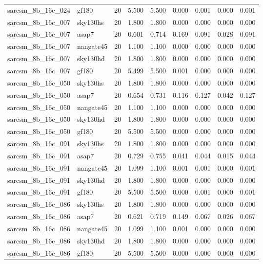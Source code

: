 \begin{tabular}{llrrrrrrr}
sarcsm\_8b\_16c\_024 & gf180 & 20 & 5.500 & 5.500 & 0.000 & 0.001 & 0.000 & 0.001 \\
sarcsm\_8b\_16c\_007 & sky130hs & 20 & 1.800 & 1.800 & 0.000 & 0.000 & 0.000 & 0.000 \\
sarcsm\_8b\_16c\_007 & asap7 & 20 & 0.601 & 0.714 & 0.169 & 0.091 & 0.028 & 0.091 \\
sarcsm\_8b\_16c\_007 & nangate45 & 20 & 1.100 & 1.100 & 0.000 & 0.000 & 0.000 & 0.000 \\
sarcsm\_8b\_16c\_007 & sky130hd & 20 & 1.800 & 1.800 & 0.000 & 0.000 & 0.000 & 0.000 \\
sarcsm\_8b\_16c\_007 & gf180 & 20 & 5.499 & 5.500 & 0.001 & 0.000 & 0.000 & 0.000 \\
sarcsm\_8b\_16c\_050 & sky130hs & 20 & 1.800 & 1.800 & 0.000 & 0.000 & 0.000 & 0.000 \\
sarcsm\_8b\_16c\_050 & asap7 & 20 & 0.654 & 0.731 & 0.116 & 0.127 & 0.042 & 0.127 \\
sarcsm\_8b\_16c\_050 & nangate45 & 20 & 1.100 & 1.100 & 0.000 & 0.000 & 0.000 & 0.000 \\
sarcsm\_8b\_16c\_050 & sky130hd & 20 & 1.800 & 1.800 & 0.000 & 0.000 & 0.000 & 0.000 \\
sarcsm\_8b\_16c\_050 & gf180 & 20 & 5.500 & 5.500 & 0.000 & 0.000 & 0.000 & 0.000 \\
sarcsm\_8b\_16c\_091 & sky130hs & 20 & 1.800 & 1.800 & 0.000 & 0.000 & 0.000 & 0.000 \\
sarcsm\_8b\_16c\_091 & asap7 & 20 & 0.729 & 0.755 & 0.041 & 0.044 & 0.015 & 0.044 \\
sarcsm\_8b\_16c\_091 & nangate45 & 20 & 1.099 & 1.100 & 0.001 & 0.001 & 0.000 & 0.001 \\
sarcsm\_8b\_16c\_091 & sky130hd & 20 & 1.800 & 1.800 & 0.000 & 0.000 & 0.000 & 0.000 \\
sarcsm\_8b\_16c\_091 & gf180 & 20 & 5.500 & 5.500 & 0.000 & 0.001 & 0.000 & 0.001 \\
sarcsm\_8b\_16c\_086 & sky130hs & 20 & 1.800 & 1.800 & 0.000 & 0.000 & 0.000 & 0.000 \\
sarcsm\_8b\_16c\_086 & asap7 & 20 & 0.621 & 0.719 & 0.149 & 0.067 & 0.026 & 0.067 \\
sarcsm\_8b\_16c\_086 & nangate45 & 20 & 1.099 & 1.100 & 0.001 & 0.000 & 0.000 & 0.000 \\
sarcsm\_8b\_16c\_086 & sky130hd & 20 & 1.800 & 1.800 & 0.000 & 0.000 & 0.000 & 0.000 \\
sarcsm\_8b\_16c\_086 & gf180 & 20 & 5.500 & 5.500 & 0.000 & 0.000 & 0.000 & 0.000 \\

\end{tabular}
